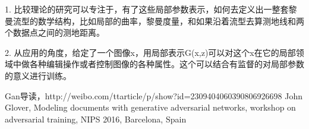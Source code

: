 1. 比较理论的研究可以专注于，有了这些局部参数表示，如何去定义出一整套黎曼流型的数学结构，比如局部的曲率，黎曼度量，和如果沿着流型去算测地线和两个数据点之间的测地距离。

2. 从应用的角度，给定了一个图像x，用局部表示G(x,z)可以对这个x在它的局部领域中做各种编辑操作或者控制图像的各种属性。这个可以结合有监督的对局部参数的意义进行训练。



\begin{thebibliography}{99}
 Gan导读，http://weibo.com/ttarticle/p/show?id=2309404060390806926698
 John Glover, Modeling documents with generative adversarial networks, workshop on adversarial training, NIPS 2016, Barcelona, Spain

\end{thebibliography}

 

